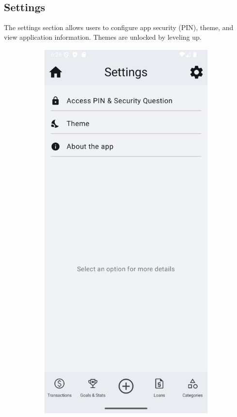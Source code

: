 \documentclass[a4paper,12pt]{article}
\begin{document}
\subsection{Settings}
The settings section allows users to configure app security (PIN), theme, and view application information. Themes are unlocked by leveling up.

\begin{figure}[H]
    \centering
    \begin{subfigure}[b]{0.23\textwidth}
        \includegraphics[width=\textwidth]{settings.png}

\end{subfigure}
\end{figure}
\end{document}
